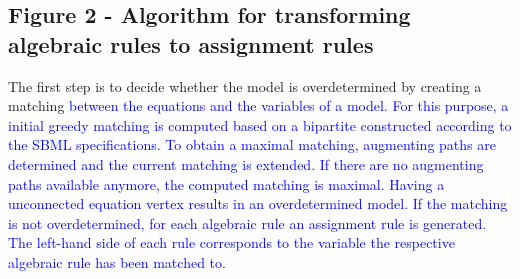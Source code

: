 \documentclass[10pt]{bmc_article}
\newenvironment{bmcformat}{\fussy\setboolean{publ}{true}}{\fussy}
\newcommand{\COR}[1]                      {\textcolor{blue}{#1}}
\begin{document}
\begin{bmcformat}
\subsection*{Figure 2 - Algorithm for transforming algebraic rules to assignment rules}
The first step is to decide whether the model is overdetermined by creating a matching \COR{ between the equations and the variables of a model. For this purpose, a initial greedy matching is computed based on a bipartite constructed according to the \acs{SBML} specifications. To obtain a maximal matching, augmenting
paths are determined and the current matching is extended. If there are no augmenting paths available anymore,
the computed matching is maximal. Having a unconnected equation vertex results in an overdetermined model.
If the matching is not overdetermined, for each algebraic rule an assignment rule is generated. The left-hand side of each rule corresponds to the variable the respective algebraic rule has been matched to.}


\end{bmcformat}
\end{document}
